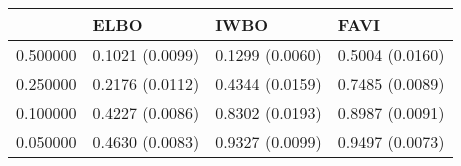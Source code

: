 \begin{tabular}{llll}
\toprule
 & ELBO & IWBO & FAVI \\
\midrule
0.500000 & 0.1021 (0.0099) & 0.1299 (0.0060) & 0.5004 (0.0160) \\
0.250000 & 0.2176 (0.0112) & 0.4344 (0.0159) & 0.7485 (0.0089) \\
0.100000 & 0.4227 (0.0086) & 0.8302 (0.0193) & 0.8987 (0.0091) \\
0.050000 & 0.4630 (0.0083) & 0.9327 (0.0099) & 0.9497 (0.0073) \\
\bottomrule
\end{tabular}
